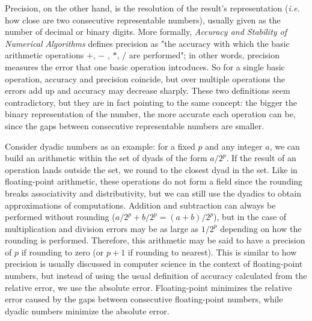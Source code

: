 Precision, on the other hand, is the resolution of the result's representation (\textit{i.e.} how close are two consecutive representable numbers), usually given as the number of decimal or binary digits. More formally, \textit{Accuracy and Stability of Numerical Algorithms} \cite{AccNumAlg} defines precision as "the accuracy with which the basic arithmetic operations $+$, $-$ , $*$, $/$ are performed"; in other words, precision measures the error that one basic operation introduces. So for a single basic operation, accuracy and precision coincide, but over multiple operations the errors add up and accuracy may decrease sharply. These two definitions seem contradictory, but they are in fact pointing to the same concept: the bigger the binary representation of the number, the more accurate each operation can be, since the gaps between consecutive representable numbers are smaller.

Consider dyadic numbers as an example: for a fixed $p$ and any integer $a$, we can build an arithmetic within the set of dyads of the form $a/2^p$. If the result of an operation lands outside the set, we round to the closest dyad in the set. Like in floating-point arithmetic, these operations do not form a field since the rounding breaks associativity and distributivity, but we can still use the dyadics to obtain approximations of computations. Addition and subtraction can always be performed without rounding ($a/2^p + b/2^p = (a+b)/2^p$), but in the case of multiplication and division errors may be as large as $1/2^p$ depending on how the rounding is performed. Therefore, this arithmetic may be said to have a precision of $p$ if rounding to zero (or $p+1$ if rounding to nearest). This is similar to how precision is usually discussed in computer science in the context of floating-point numbers, but instead of using the usual definition of accuracy calculated from the relative error, we use the absolute error. Floating-point minimizes the relative error caused by the gaps between consecutive floating-point numbers, while dyadic numbers minimize the absolute error.

